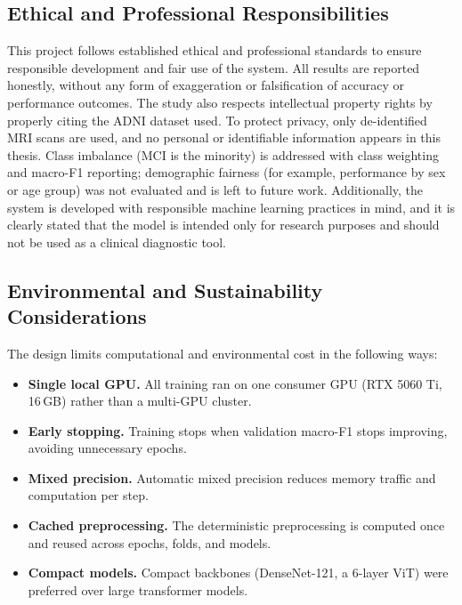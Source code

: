 \subsection{Ethical and Professional Responsibilities}
This project follows established ethical and professional standards to ensure responsible development and fair use of the system. All results are reported honestly, without any form of exaggeration or falsification of accuracy or performance outcomes. The study also respects intellectual property rights by properly citing the ADNI dataset used. To protect privacy, only de-identified MRI scans are used, and no personal or identifiable information appears in this thesis. Class imbalance (MCI is the minority) is addressed with class weighting and macro-F1 reporting; demographic fairness (for example, performance by sex or age group) was not evaluated and is left to future work. Additionally, the system is developed with responsible machine learning practices in mind, and it is clearly stated that the model is intended only for research purposes and should not be used as a clinical diagnostic tool.
\subsection{Environmental and Sustainability Considerations}
The design limits computational and environmental cost in the following ways:
\begin{itemize}
    \item \textbf{Single local GPU.} All training ran on one consumer GPU (RTX 5060 Ti, 16\,GB) rather than a multi-GPU cluster.
    \item \textbf{Early stopping.} Training stops when validation macro-F1 stops improving, avoiding unnecessary epochs.
    \item \textbf{Mixed precision.} Automatic mixed precision reduces memory traffic and computation per step.
    \item \textbf{Cached preprocessing.} The deterministic preprocessing is computed once and reused across epochs, folds, and models.
    \item \textbf{Compact models.} Compact backbones (DenseNet-121, a 6-layer ViT) were preferred over large transformer models.
\end{itemize}

